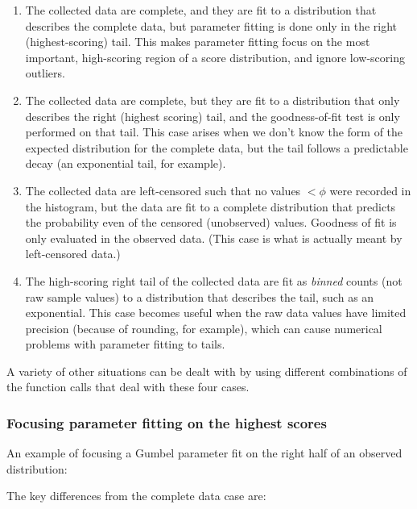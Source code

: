 \begin{enumerate}
\item The collected data are complete, and they are fit to a
      distribution that describes the complete data, but parameter
      fitting is done only in the right (highest-scoring) tail. This
      makes parameter fitting focus on the most important,
      high-scoring region of a score distribution, and ignore
      low-scoring outliers.

\item The collected data are complete, but they are fit to a
      distribution that only describes the right (highest scoring)
      tail, and the goodness-of-fit test is only performed on that
      tail. This case arises when we don't know the form of the
      expected distribution for the complete data, but the tail
      follows a predictable decay (an exponential tail, for example).

\item The collected data are left-censored such that no values $<
      \phi$ were recorded in the histogram, but the data are fit to a
      complete distribution that predicts the probability even of the
      censored (unobserved) values. Goodness of fit is only evaluated
      in the observed data. (This case is what is actually meant by
      left-censored data.)

\item The high-scoring right tail of the collected data are fit as
      \emph{binned} counts (not raw sample values) to a distribution
      that describes the tail, such as an exponential. This case
      becomes useful when the raw data values have limited precision
      (because of rounding, for example), which can cause numerical
      problems with parameter fitting to tails.
\end{enumerate}

A variety of other situations can be dealt with by using different
combinations of the function calls that deal with these four cases.


\subsubsection{Focusing parameter fitting on the highest scores}

An example of focusing a Gumbel parameter fit on the right half of an
observed distribution:



The key differences from the complete data case are:

